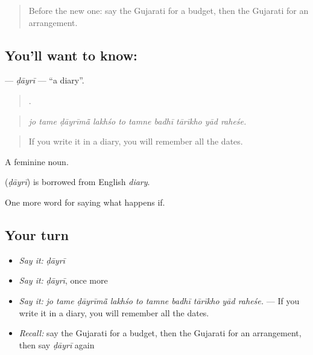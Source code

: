 \label{lesson:GU-C528-dayri}



\begin{quote}
Before the new one: say the Gujarati for a budget, then the Gujarati for an arrangement.
\end{quote}

\subsection*{You'll want to know: }
\textbf{} — \emph{ḍāyrī} — \textquotedblleft{}a diary\textquotedblright{}.

\begin{quote}
         .
\end{quote}

\begin{quote}
\emph{jo tame ḍāyrīmā̃ lakhśo to tamne badhī tārīkho yād raheśe.}
\end{quote}

\begin{quote}
If you write it in a diary, you will remember all the dates.
\end{quote}

A feminine noun.

\begin{cousinweb}
\textbf{} (\emph{ḍāyrī}) is borrowed from English \emph{diary}.
\end{cousinweb}

\begin{grammarlens}[title={What you've built}]
One more word for saying what happens if.
\end{grammarlens}

\subsection*{Your turn}
\begin{itemize}
\raggedright
  \item \emph{Say it:} \emph{ḍāyrī}
  \item \emph{Say it:} \emph{ḍāyrī}, once more
  \item \emph{Say it:} \emph{jo tame ḍāyrīmā̃ lakhśo to tamne badhī tārīkho yād raheśe.} — If you write it in a diary, you will remember all the dates.
  \item \emph{Recall:} say the Gujarati for a budget, then the Gujarati for an arrangement, then say \emph{ḍāyrī} again
\end{itemize}


